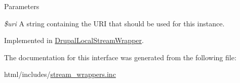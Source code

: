\begin{DoxyParams}{Parameters}
\item[{\em \$uri}]A string containing the URI that should be used for this instance. \end{DoxyParams}


Implemented in \hyperlink{classDrupalLocalStreamWrapper_ae9502ad74b2498b9c93e4affc43e7109}{DrupalLocalStreamWrapper}.

The documentation for this interface was generated from the following file:\begin{DoxyCompactItemize}
\item 
html/includes/\hyperlink{stream__wrappers_8inc}{stream\_\-wrappers.inc}\end{DoxyCompactItemize}
